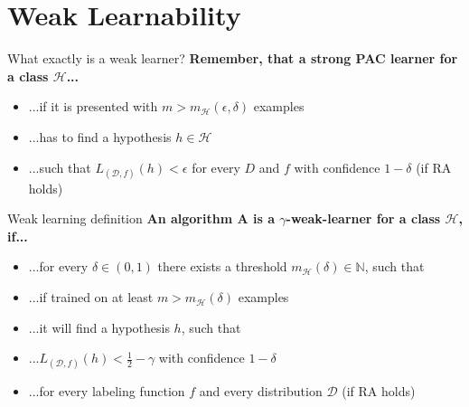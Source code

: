 \section{Weak Learnability}

\begin{frame}{What exactly is a weak learner?}
    \textbf{Remember, that a strong PAC learner for a class $\mathcal{H}$...} \pause
    \begin{itemize}
        \item ...if it is presented with $m > m_\mathcal{H}(\epsilon, \delta)$ examples \pause
        \item ...has to find a hypothesis $h \in \mathcal{H}$ \pause
        \item ...such that $L_{(\mathcal{D}, f)}(h) < \epsilon$ for every $D$ and $f$ with confidence $1 - \delta$ (if RA holds) \pause
    \end{itemize}
    \vspace{0.5cm}
    \centering
\end{frame}

\begin{frame}{Weak learning definition}
    \textbf{An algorithm A is a $\gamma$-weak-learner for a class $\mathcal{H}$, if...} \pause
    \begin{itemize}
        \item ...for every $\delta \in (0, 1)$ there exists a threshold 
            $m_{\mathcal{H}}(\delta) \in \mathbb{N}$, such that \pause
        \item ...if trained on at least $m > m_{\mathcal{H}}(\delta)$ examples \pause
        \item ...it will find a hypothesis $h$, such that \pause
        \item ...$L_{(\mathcal{D}, f)}(h) < \frac{1}{2} - \gamma$
            with confidence $1 - \delta$ \pause
        \item ...for every labeling function $f$ and every distribution $\mathcal{D}$ (if RA holds)
    \end{itemize}
\end{frame}